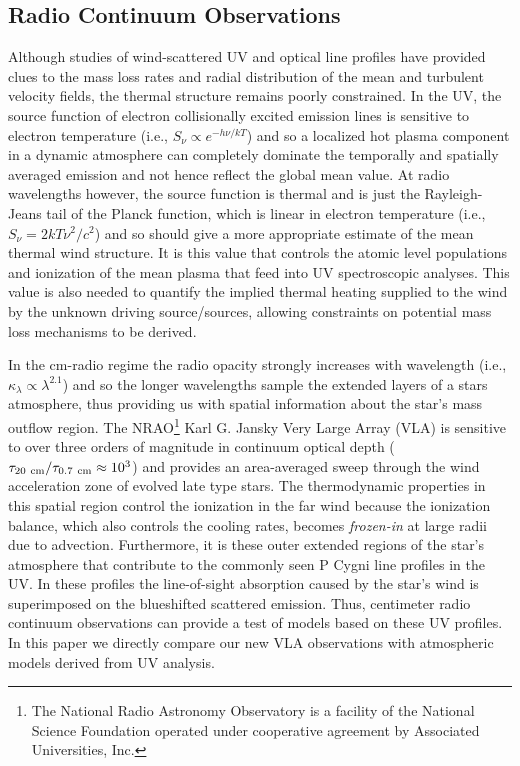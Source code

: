 \documentclass[iop]{emulateapj}
\begin{document}
\subsection{Radio Continuum Observations} \label{intro1} 

Although studies of wind-scattered UV and optical line profiles have provided clues to the mass loss rates and radial distribution of the mean and turbulent velocity fields, the thermal structure remains poorly constrained. In the UV, the source function of electron collisionally excited emission lines is sensitive to electron temperature (i.e., $S_{\nu} \propto e^{-h\nu /kT}$) and so a localized hot plasma component in a dynamic atmosphere can completely dominate the temporally and spatially averaged emission and not hence reflect the global mean value. At radio wavelengths however, the source function is thermal and is just the Rayleigh-Jeans tail of the Planck function, which is linear in electron temperature (i.e., $S_{\nu} = {2kT\nu ^2 /c^2}$) and so should give a more appropriate estimate of the mean thermal wind structure. It is this value that controls the atomic level populations and ionization of the mean plasma that feed into UV spectroscopic analyses. This value is also needed to quantify the implied thermal heating supplied to the  wind by the unknown driving source/sources, allowing constraints on potential mass loss mechanisms to be derived.

In the cm-radio regime the radio opacity strongly increases with wavelength (i.e., $ \kappa _{\lambda} \propto \lambda ^{2.1}$) and so the longer wavelengths sample the extended layers of a stars atmosphere, thus	 providing us with spatial information about the star's mass outflow region. The NRAO\footnote{The National Radio Astronomy Observatory is a facility of the National Science Foundation operated under cooperative agreement by Associated Universities, Inc.} Karl G. Jansky Very Large Array (VLA) is sensitive to over three orders of magnitude in continuum optical depth ($\tau _{20 \ \rm{cm}}/\tau _{0.7 \ \rm{cm}} \approx 10^3$) and provides an area-averaged sweep through the wind acceleration zone of evolved late type stars. The thermodynamic properties in this spatial region control the ionization in the far wind because the ionization balance, which also controls the cooling rates, becomes \textit{frozen-in} at large radii due to advection. Furthermore, it is these outer extended regions of the star's atmosphere that contribute to the commonly seen P Cygni line profiles in the UV. In these profiles the line-of-sight absorption caused by the star's wind is superimposed on the blueshifted scattered emission. Thus, centimeter radio continuum observations can provide a test of models based on these UV profiles. In this paper we directly compare our new VLA observations with atmospheric models derived from UV analysis.
\end{document}
